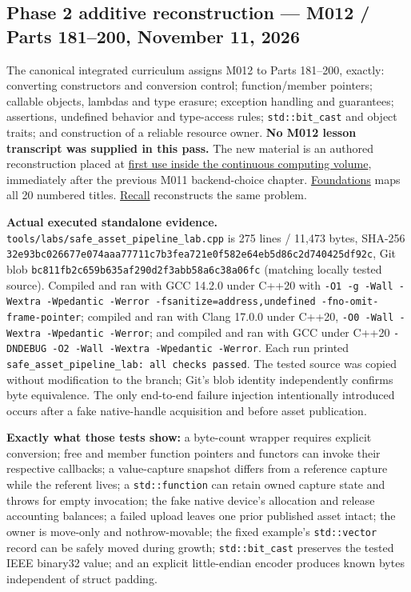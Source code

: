 \subsection{Phase 2 additive reconstruction --- M012 / Parts 181--200, November 11, 2026}\label{appendix-a103e7846d21-phase-2-additive-reconstruction-m012-parts-181200-november-11-2026}

The canonical integrated curriculum assigns M012 to Parts 181--200, exactly: converting constructors and conversion control; function/member pointers; callable objects, lambdas and type erasure; exception handling and guarantees; assertions, undefined behavior and type-access rules; \texttt{std::bit\_cast} and object traits; and construction of a reliable resource owner. \textbf{No M012 lesson transcript was supplied in this pass.} The new material is an authored reconstruction placed at \hyperref[01-foundations-i-ch004-from-an-accepted-render-request-to-a-resource-that-survives-failures-and-callbacks]{first use inside the continuous computing volume}, immediately after the previous M011 backend-choice chapter. \hyperref[appendix-fd090d982a15-m012-parts-181200-typed-asset-requests-deferred-callbacks-and-transactional-publication]{Foundations} maps all 20 numbered titles. \hyperref[appendix-960160274237-one-request-one-transaction-callbacks-that-may-outlive-their-caller-m012-reconstruction]{Recall} reconstructs the same problem.

\textbf{Actual executed standalone evidence.} \texttt{tools/labs/safe\_asset\_pipeline\_lab.cpp} is 275 lines / 11,473 bytes, SHA-256 \texttt{32e93bc026677e074aaa77711c7b3fea721e0f582e64eb5d86c2d740425df92c}, Git blob \texttt{bc811fb2c659b635af290d2f3abb58a6c38a06fc} (matching locally tested source). Compiled and ran with GCC 14.2.0 under C++20 with \texttt{-O1\ -g\ -Wall\ -Wextra\ -Wpedantic\ -Werror\ -fsanitize=address,undefined\ -fno-omit-frame-pointer}; compiled and ran with Clang 17.0.0 under C++20, \texttt{-O0\ -Wall\ -Wextra\ -Wpedantic\ -Werror}; and compiled and ran with GCC under C++20 \texttt{-DNDEBUG\ -O2\ -Wall\ -Wextra\ -Wpedantic\ -Werror}. Each run printed \texttt{safe\_asset\_pipeline\_lab:\ all\ checks\ passed}. The tested source was copied without modification to the branch; Git's blob identity independently confirms byte equivalence. The only end-to-end failure injection intentionally introduced occurs after a fake native-handle acquisition and before asset publication.

\textbf{Exactly what those tests show:} a byte-count wrapper requires explicit conversion; free and member function pointers and functors can invoke their respective callbacks; a value-capture snapshot differs from a reference capture while the referent lives; a \texttt{std::function} can retain owned capture state and throws for empty invocation; the fake native device's allocation and release accounting balances; a failed upload leaves one prior published asset intact; the owner is move-only and nothrow-movable; the fixed example's \texttt{std::vector} record can be safely moved during growth; \texttt{std::bit\_cast} preserves the tested IEEE binary32 value; and an explicit little-endian encoder produces known bytes independent of struct padding.

